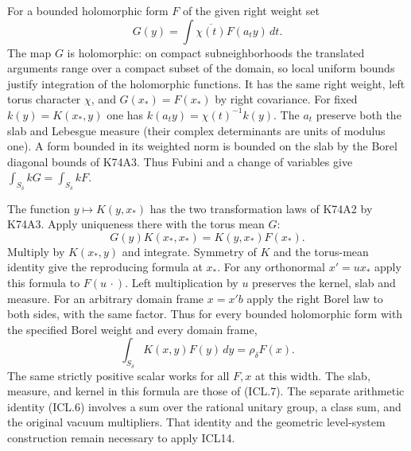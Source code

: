 For a bounded
holomorphic form $F$ of the given right weight set
\[
                  G(y)=\int \overline{\chi(t)}F(a_ty)\,dt.
\]
The map $G$ is holomorphic: on compact subneighborhoods the
translated arguments range over a compact subset of the domain, so
local uniform bounds justify integration of the holomorphic
functions. It has the same right weight, left torus character
$\chi$, and $G(x_*)=F(x_*)$ by right covariance. For fixed
$k(y)=K(x_*,y)$ one has $k(a_ty)=\chi(t)^{-1}k(y)$.
The $a_t$ preserve both the slab and Lebesgue measure (their complex
determinants are units of modulus one). A form bounded in its
weighted norm is bounded on the slab by the Borel diagonal bounds
of K74A3. Thus Fubini and a change of variables give
$\int_{S_\delta} kG=\int_{S_\delta} kF$.

The function $y\mapsto K(y,x_*)$ has the two transformation laws of
K74A2 by K74A3. Apply uniqueness there with the torus mean $G$:
\[
   G(y) K(x_*,x_*)=K(y,x_*)F(x_*).
\]
Multiply by $K(x_*,y)$ and integrate. Symmetry of $K$ and the
torus-mean identity give the reproducing formula at $x_*$. For
any orthonormal $x'=u x_*$ apply this formula to $F(u\,\cdot)$.
Left multiplication by $u$ preserves the kernel, slab and measure.
For an arbitrary domain frame $x=x'b$ apply the right Borel law to
both sides, with the same factor. Thus for every bounded holomorphic
form with the specified Borel weight and every domain frame,
\[
             \int_{S_\delta} K(x,y)F(y)\,dy
                          =\rho_\delta F(x).
\]
The same strictly positive scalar works for all $F,x$ at this
width. The slab, measure, and kernel in this formula are those of
(ICL.7). The separate arithmetic identity (ICL.6) involves a sum
over the rational unitary group, a class sum, and the original
vacuum multipliers. That identity and the geometric level-system
construction remain necessary to apply ICL14.
